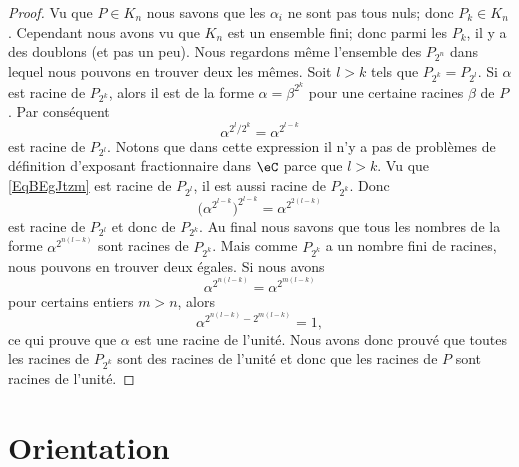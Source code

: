 \begin{proof}
	Vu que \( P\in K_n\) nous savons que les \( \alpha_i\) ne sont pas tous nuls; donc \( P_k\in K_n\). Cependant nous avons vu que \( K_n\) est un ensemble fini; donc parmi les \( P_k\), il y a des doublons (et pas un peu). Nous regardons même l'ensemble des \( P_{2^n}\) dans lequel nous pouvons en trouver deux les mêmes. Soit \( l>k\) tels que \( P_{2^k}=P_{2^l}\). Si \( \alpha\) est racine de \( P_{2^k}\), alors il est de la forme \( \alpha=\beta^{2^k}\) pour une certaine racines \( \beta\) de \( P\). Par conséquent
	\begin{equation}    \label{EqBEgJtzm}
		\alpha^{2^l/2^k}=\alpha^{2^{l-k}}
	\end{equation}
	est racine de \( P_{2^l}\). Notons que dans cette expression il n'y a pas de problèmes de définition d'exposant fractionnaire dans \( \eC\) parce que \( l>k\). Vu que \eqref{EqBEgJtzm} est racine de \( P_{2^l}\), il est aussi racine de \( P_{2^k}\). Donc
	\begin{equation}
		\big( \alpha^{2^{l-k}} \big)^{2^{l-k}}=\alpha^{2^{2(l-k)}}
	\end{equation}
	est racine de \( P_{2^l}\) et donc de \( P_{2^k}\). Au final nous savons que tous les nombres de la forme \( \alpha^{2^{n(l-k)}}\) sont racines de \( P_{2^k}\). Mais comme \( P_{2^k}\) a un nombre fini de racines, nous pouvons en trouver deux égales. Si nous avons
	\begin{equation}
		\alpha^{2^{n(l-k)}}=\alpha^{2^{m(l-k)}}
	\end{equation}
	pour certains entiers \( m>n\), alors
	\begin{equation}
		\alpha^{2^{n(l-k)}-2^{m(l-k)}}=1,
	\end{equation}
	ce qui prouve que \( \alpha\) est une racine de l'unité. Nous avons donc prouvé que toutes les racines de \( P_{2^k}\) sont des racines de l'unité et donc que les racines de \( P\) sont racines de l'unité.
\end{proof}


\section{Orientation}

